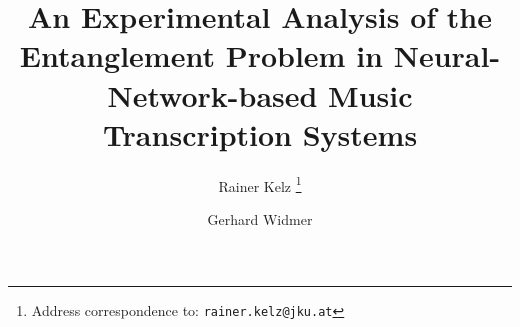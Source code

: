 \documentclass[twocolumn]{article}
\title{An Experimental Analysis of the Entanglement Problem in Neural-Network-based Music Transcription Systems}
\author[1]{Rainer Kelz \thanks{Address correspondence to: \texttt{rainer.kelz@jku.at}}}
\author[1]{Gerhard Widmer}
\affil[1]{Department of Computational Perception, Johannes Kepler University Linz, Austria}
\begin{document}
\maketitle
\thispagestyle{fancy}

\begin{abstract}

\end{abstract}






\newpage

\end{document}
